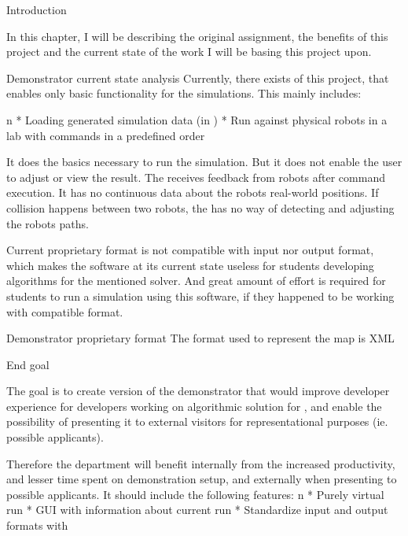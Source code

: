 \chap Introduction

In this chapter, I will be describing the original assignment, the benefits of this project and the current state of the work I will be basing this project upon.



\sec Demonstrator current state analysis
Currently, there exists {\oldRepo} of this project, that enables only basic functionality for the simulations. This mainly includes:

\begitems \style n
    * Loading generated simulation data (in {\oldFormat})
    * Run against physical robots in a lab with commands in a predefined order
\enditems

It does the basics necessary to run the simulation. But it does not enable the user to adjust or view the result. The {\oldRepo} receives feedback from robots after command execution. It has no continuous data about the robots real-world positions. If collision happens between two robots, the {\oldRepo} has no way of detecting and adjusting the robots paths.

Current proprietary format is not compatible with {\mapfIR} input nor output format, which makes the software at its current state useless for students developing algorithms for the mentioned solver. And great amount of effort is required for students to run a simulation using this software, if they happened to be working with compatible format.

\sec Demonstrator proprietary format
The format used to represent the map is XML 

\sec End goal

The goal is to create version of the demonstrator that would improve developer experience for developers working on algorithmic solution for {\mapfIR}, and enable the possibility of presenting it to external visitors for representational purposes (ie. possible applicants).

Therefore the department will benefit internally from the increased productivity, and lesser time spent on demonstration setup, and externally when presenting to possible applicants.
It should include the following features:
\begitems \style n
    * Purely virtual run
    * GUI with information about current run
    * Standardize input and output formats with \mapfIR
\enditems